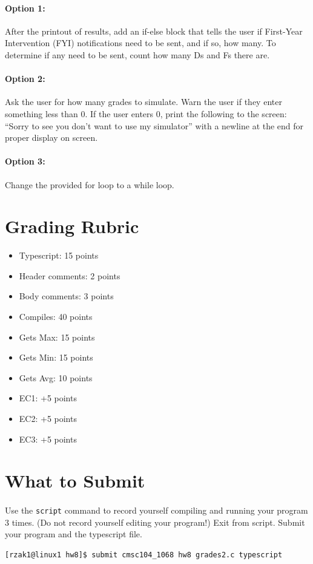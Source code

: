 \documentclass[letter,11pt]{article}
\begin{document}
\paragraph{Option 1:} After the printout of results, add an if-else block that tells the user if First-Year Intervention (FYI) notifications need to be sent, and if so, how many. To determine if any need to be sent, count how many Ds and Fs there are.
\paragraph{Option 2:} Ask the user for how many grades to simulate. Warn the user if they enter something less than 0. If the user enters 0, print the following to the screen: ``Sorry to see you don’t want to use my simulator'' with a newline at the end for proper display on screen.
\paragraph{Option 3:} Change the provided for loop to a while loop. 

\section*{Grading Rubric}
\begin{itemize}
    \item Typescript: 15 points
    \item Header comments: 2 points
    \item Body comments: 3 points
    \item Compiles: 40 points
    \item Gets Max: 15 points
    \item Gets Min: 15 points
    \item Gets Avg: 10 points
    \item EC1: +5 points
    \item EC2: +5 points
    \item EC3: +5 points
\end{itemize}

\section*{What to Submit}
\paragraph{}Use the \texttt{script} command to record yourself compiling and running your program 3 times. (Do not record yourself editing your program!) Exit from script. Submit your program and the typescript file.
\begin{verbatim}
[rzak1@linux1 hw8]$ submit cmsc104_1068 hw8 grades2.c typescript
\end{verbatim}
\end{document}
